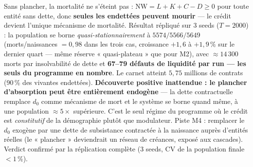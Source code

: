 \documentclass[11pt,a4paper]{article}
\newcommand{\NW}{\mathrm{NW}}
\begin{document}
Sans plancher, la mortalité ne s'éteint pas : $\NW = L + K + C - D \ge 0$
pour toute entité sans dette, donc \textbf{seules les endettées peuvent
mourir} — le crédit devient l'unique mécanisme de mortalité. Résultat
répliqué sur 3 seeds ($T{=}2000$) : la population se borne
\emph{quasi-stationnairement} à $5574 / 5566 / 5649$ (morts/naissances
$= 0{,}98$ dans les trois cas, croissance $+1{,}6$ à $+1{,}9\,\%$ sur le
dernier quart — même réserve « quasi-plateau » que pour M2), avec
$\approx 14\,300$ morts par insolvabilité de dette et \textbf{67--79
défauts de liquidité par run — les seuls du programme en nombre}. Le
carnet atteint $5{,}75$ millions de contrats (90\,\% des vivantes
endettées). \textbf{Découverte positive inattendue : le plancher
d'absorption peut être entièrement endogène} — la dette contractuelle
remplace $d_0$ comme mécanisme de mort et le système se borne quand même,
à une population $\approx 5\times$ supérieure. C'est le seul régime du
programme où le crédit est \emph{constitutif} de la démographie plutôt que
modulateur. Piste M4 : remplacer le $d_0$ exogène par une dette de
subsistance contractée à la naissance auprès d'entités réelles (le
« plancher » deviendrait un réseau de créances, exposé aux cascades).
Verdict confirmé par la réplication complète (3 seeds, CV de la
population finale $< 1\,\%$).
\end{document}
